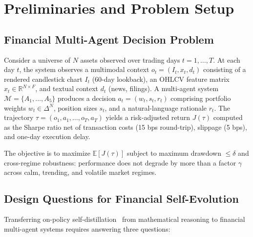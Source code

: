 \section{Preliminaries and Problem Setup}
\label{sec:problem}

\subsection{Financial Multi-Agent Decision Problem}

Consider a universe of $N$ assets observed over trading days $t = 1, \ldots, T$. At each day $t$, the system observes a multimodal context $o_t = (I_t, x_t, d_t)$ consisting of a rendered candlestick chart $I_t$ (60-day lookback), an OHLCV feature matrix $x_t \in \mathbb{R}^{N \times F}$, and textual context $d_t$ (news, filings). A multi-agent system $\mathcal{M} = \{A_1, \ldots, A_5\}$ produces a decision $a_t = (w_t, s_t, r_t)$ comprising portfolio weights $w_t \in \Delta^N$, position sizes $s_t$, and a natural-language rationale $r_t$. The trajectory $\tau = (o_1, a_1, \ldots, o_T, a_T)$ yields a risk-adjusted return $J(\tau)$ computed as the Sharpe ratio net of transaction costs (15 bps round-trip), slippage (5 bps), and one-day execution delay.

The objective is to maximize $\mathbb{E}[J(\tau)]$ subject to maximum drawdown $\leq \delta$ and cross-regime robustness: performance does not degrade by more than a factor $\gamma$ across calm, trending, and volatile market regimes.

\subsection{Design Questions for Financial Self-Evolution}

Transferring on-policy self-distillation~\cite{opsd2026} from mathematical reasoning to financial multi-agent systems requires answering three questions:

